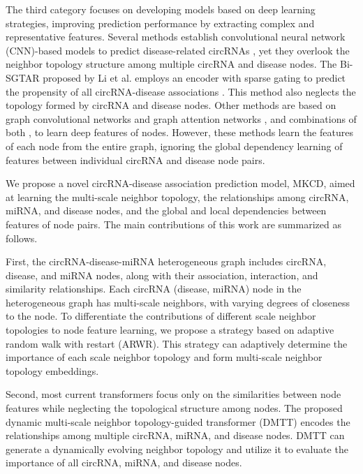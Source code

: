\documentclass[journal=jcisd8,manuscript=article]{achemso}
\begin{document}
The third category focuses on developing models based on deep learning strategies, improving prediction performance by extracting complex and representative features. Several methods establish convolutional neural network (CNN)-based models to predict disease-related circRNAs \cite{tian2024mamlcda, wang2020efficient, lu2020improving}, yet they overlook the neighbor topology structure among multiple circRNA and disease nodes. The Bi-SGTAR proposed by Li et al. employs an encoder with sparse gating to predict the propensity of all circRNA-disease associations \cite{li2024bi}. This method also neglects the topology formed by circRNA and disease nodes. Other methods are based on graph convolutional networks \cite{shang2024sgfccda, liu2023mpclcda, wu2022mdgf} and graph attention networks \cite{wu2023mlngcf}, and combinations of both \cite{dai2022graphcda}, to learn deep features of nodes. However, these methods learn the features of each node from the entire graph, ignoring the global dependency learning of features between individual circRNA and disease node pairs.

We propose a novel circRNA-disease association prediction model, MKCD, aimed at learning the multi-scale neighbor topology, the relationships among circRNA, miRNA, and disease nodes, and the global and local dependencies between features of node pairs. The main contributions of this work are summarized as follows.

First, the circRNA-disease-miRNA heterogeneous graph includes circRNA, disease, and miRNA nodes, along with their association, interaction, and similarity relationships. Each circRNA (disease, miRNA) node in the heterogeneous graph has multi-scale neighbors, with varying degrees of closeness to the node. To differentiate the contributions of different scale neighbor topologies to node feature learning, we propose a strategy based on adaptive random walk with restart (ARWR). This strategy can adaptively determine the importance of each scale neighbor topology and form multi-scale neighbor topology embeddings.

Second, most current transformers focus only on the similarities between node features while neglecting the topological structure among nodes. The proposed dynamic multi-scale neighbor topology-guided transformer (DMTT) encodes the relationships among multiple circRNA, miRNA, and disease nodes. DMTT can generate a dynamically evolving neighbor topology and utilize it to evaluate the importance of all circRNA, miRNA, and disease nodes.
\end{document}
